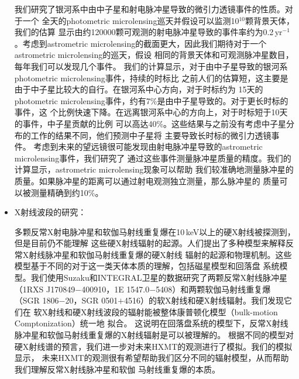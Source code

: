 \begin{itemize}
我们研究了银河系中由中子星和射电脉冲星导致的微引力透镜事件的性质。对于一个
全天的photometric microlensing巡天并假设可以监测10$^{10}$颗背景天体，我们的估算
显示由约120000颗可观测的射电脉冲星导致的事件率约为0.2\,yr$^{-1}$。考虑到astrometric 
microlensing的截面更大，因此我们期待对于一个astrometric microlensing的巡天，假设
相同的背景天体和可观测脉冲星数目，每年我们可以发现几个事件。
%
我们的计算显示，对于由中子星导致的银河系photometric microlensing事件，持续的时标比
之前人们的估算短，这主要是由于中子星比较大的自行。在银河系中心方向，对于时标约为
15天的photometric microlensing事件，约有7\%是由中子星导致的。对于更长时标的事件，这
个比例快速下降。在远离银河系中心的方向上，对于时标短于10天的事件，中子星贡献的比例
可以高达40\%。这些结果与之前没有考虑中子星分布的工作的结果不同，他们预测中子星将
主要导致长时标的微引力透镜事件。
%
考虑到未来的望远镜很可能发现由射电脉冲星导致的astrometric microlensing事件，我们研究了
通过这些事件测量脉冲星质量的精度。我们的计算显示，astrometric microlensing现象可以帮助
我们较准确地测量脉冲星的质量。如果脉冲星的距离可以通过射电观测独立测量，那么脉冲星的
质量可以被测量精确到约10\%。

\item X射线波段的研究：

多颗反常X射电脉冲星和软伽马射线重复爆在10\,keV以上的硬X射线被探测到，但是目前仍不能理解
这些硬X射线辐射的起源。人们提出了多种模型来解释反常X射线脉冲星和软伽马射线重复爆的硬X射线
辐射的起源和物理机制。这些模型基于不同的对于这一类天体本质的理解，包括磁星模型和回落盘
系统模型。我们使用Suzaku和INTEGRAL卫星的数据研究了两颗反常X射线脉冲星
（1RXS J170849$-$400910，1E 1547.0$-$5408）和两颗软伽马射线重复爆
（SGR 1806$-$20，SGR 0501$+$4516）的软X射线和硬X射线辐射。我们发现它们在
软X射线和硬X射线波段的辐射能被整体康普顿化模型（bulk-motion Comptonization）统一地
拟合。
这说明在回落盘系统的模型下，反常X射线脉冲星和软伽马射线重复爆的X射线辐射是可以被理解的。
根据不同的模型对硬X射线谱的预言，我们进一步对未来HXMT的观测进行了模拟。我们的模拟显示，
未来HXMT的观测很有希望帮助我们区分不同的辐射模型，从而帮助我们理解反常X射线脉冲星和软伽
马射线重复爆的本质。

\end{itemize}
\pkuthssffaq

